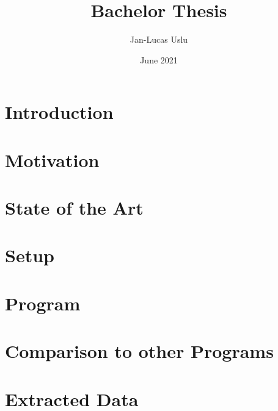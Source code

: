 \documentclass{article}
\title{Bachelor Thesis}
\author{Jan-Lucas Uslu}
\date{June 2021}
\begin{document}
\maketitle
\newpage

\tableofcontents
\newpage

\section{Introduction}

\section{Motivation}


\newpage
\section{State of the Art}

\newpage
\section{Setup}


\newpage
\section{Program}

 
\section{Comparison to other Programs}



\newpage
\section{Extracted Data}
\end{document}
